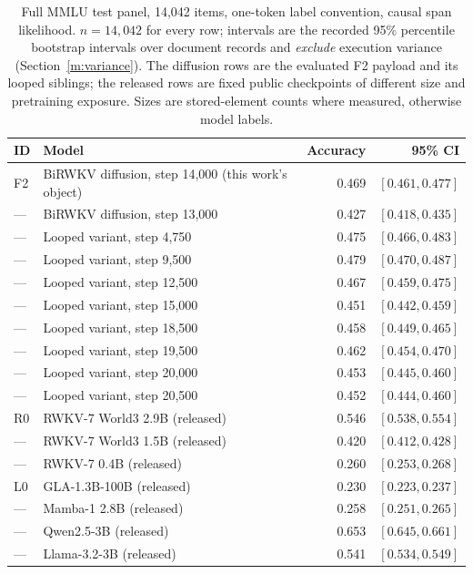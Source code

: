 \begin{table}[t]
\centering\small
\caption{Full MMLU test panel, 14{,}042 items, one-token label convention, causal span
likelihood. $n=14{,}042$ for every row; intervals are the recorded 95\% percentile bootstrap intervals over document records and \emph{exclude} execution variance (Section~\ref{m:variance}). The diffusion
rows are the evaluated F2 payload and its looped siblings; the released rows are fixed
public checkpoints of different size and pretraining exposure. Sizes are stored-element
counts where measured, otherwise model labels.}
\begin{tabular}{@{}llrr@{}}
\toprule
ID & Model & Accuracy & 95\% CI\\
\midrule
F2 & BiRWKV diffusion, step 14{,}000 (this work's object) & 0.469 & $[0.461,0.477]$\\
--- & BiRWKV diffusion, step 13{,}000 & 0.427 & $[0.418,0.435]$\\
--- & Looped variant, step 4{,}750 & 0.475 & $[0.466,0.483]$\\
--- & Looped variant, step 9{,}500 & 0.479 & $[0.470,0.487]$\\
--- & Looped variant, step 12{,}500 & 0.467 & $[0.459,0.475]$\\
--- & Looped variant, step 15{,}000 & 0.451 & $[0.442,0.459]$\\
--- & Looped variant, step 18{,}500 & 0.458 & $[0.449,0.465]$\\
--- & Looped variant, step 19{,}500 & 0.462 & $[0.454,0.470]$\\
--- & Looped variant, step 20{,}000 & 0.453 & $[0.445,0.460]$\\
--- & Looped variant, step 20{,}500 & 0.452 & $[0.444,0.460]$\\
\midrule
R0 & RWKV-7 World3 2.9B (released) & 0.546 & $[0.538,0.554]$\\
--- & RWKV-7 World3 1.5B (released) & 0.420 & $[0.412,0.428]$\\
--- & RWKV-7 0.4B (released) & 0.260 & $[0.253,0.268]$\\
L0 & GLA-1.3B-100B (released) & 0.230 & $[0.223,0.237]$\\
--- & Mamba-1 2.8B (released) & 0.258 & $[0.251,0.265]$\\
--- & Qwen2.5-3B (released) & 0.653 & $[0.645,0.661]$\\
--- & Llama-3.2-3B (released) & 0.541 & $[0.534,0.549]$\\
\bottomrule
\end{tabular}
\label{tab:mmlu}
\end{table}

